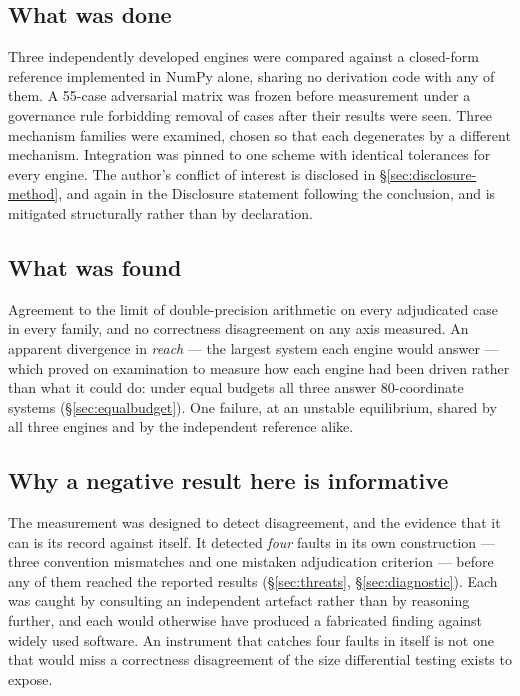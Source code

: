 \documentclass[review,12pt]{elsarticle}
\begin{document}
\subsection{What was done}
Three independently developed engines were compared against a closed-form
reference implemented in NumPy alone, sharing no derivation code with any of
them. A
55-case adversarial matrix was frozen before measurement under a governance rule
forbidding removal of cases after their results were seen. Three mechanism
families were examined, chosen so that each degenerates by a different
mechanism. Integration was pinned to one scheme with identical tolerances for
every engine. The author's conflict of interest is disclosed in
\S\ref{sec:disclosure-method}, and again in the Disclosure statement following
the conclusion, and is mitigated structurally rather than by declaration.

\subsection{What was found}
Agreement to the limit of double-precision arithmetic on every adjudicated case
in every family, and no correctness disagreement on any axis measured. An
apparent divergence in \emph{reach} --- the largest system each engine would
answer --- which proved on examination to measure how each engine had been
driven rather than what it could do: under equal budgets all three answer
80-coordinate systems (\S\ref{sec:equalbudget}). One failure, at an unstable equilibrium,
shared by all three engines and by the independent reference alike.

\subsection{Why a negative result here is informative}
The measurement was designed to detect disagreement, and the evidence that it
can is its record against itself. It detected \emph{four} faults in its own
construction --- three convention mismatches and one mistaken adjudication
criterion --- before any of them reached the reported results
(\S\ref{sec:threats}, \S\ref{sec:diagnostic}). Each was caught by consulting an
independent artefact rather than by reasoning further, and each would otherwise
have produced a fabricated finding against widely used software. An instrument
that catches four faults in itself is not one that would miss a correctness
disagreement of the size differential testing exists to expose.
\end{document}
